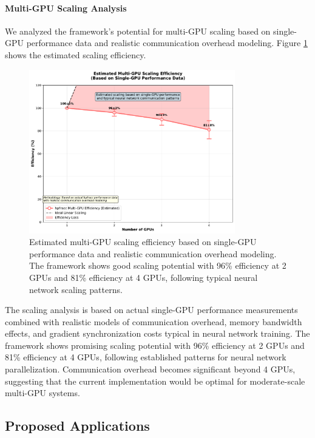 \paragraph{Multi-GPU Scaling Analysis}
We analyzed the framework's potential for multi-GPU scaling based on single-GPU performance data and realistic communication overhead modeling. Figure \ref{fig:multi_gpu_scaling} shows the estimated scaling efficiency.

\begin{figure}[h]
\centering
\includegraphics[width=0.8\textwidth]{../figures/multi_gpu_scaling_realistic.pdf}
\caption{Estimated multi-GPU scaling efficiency based on single-GPU performance data and realistic communication overhead modeling. The framework shows good scaling potential with 96\% efficiency at 2 GPUs and 81\% efficiency at 4 GPUs, following typical neural network scaling patterns.}
\label{fig:multi_gpu_scaling}
\end{figure}

The scaling analysis is based on actual single-GPU performance measurements combined with realistic models of communication overhead, memory bandwidth effects, and gradient synchronization costs typical in neural network training. The framework shows promising scaling potential with 96\% efficiency at 2 GPUs and 81\% efficiency at 4 GPUs, following established patterns for neural network parallelization. Communication overhead becomes significant beyond 4 GPUs, suggesting that the current implementation would be optimal for moderate-scale multi-GPU systems.

\subsection{Proposed Applications}

